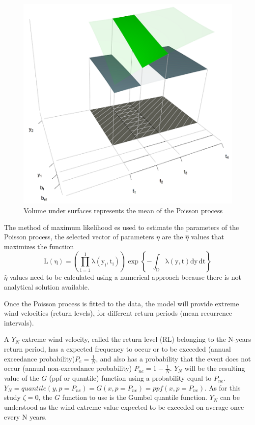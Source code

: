 \documentclass[12pt,oneside]{reedthesis}
\begin{document}
\footnotesize
\begin{figure}
\includegraphics[width=6.35in]{figure/domain3d} \caption{Volume under surfaces represents the mean of the Poisson process}\label{fig:plotdomain3dpp}
\end{figure}
\normalsize

The method of maximum likelihood es used to estimate the parameters of the Poisson process, the selected vector of parameters \(\eta\) are the \(\hat\eta\) values that maximizes the function
\begin{equation}
  \mathrm{
          L(\eta)=\left( 
                        \prod_{i=1}^I\lambda\left(y_i,t_i\right)  
                  \right)
                  \exp\left\{
                            -\int_{{D}}\lambda\left(y,t\right)dy\,dt
                     \right\}
         }
  \label{eq:pplikelihood}
\end{equation}
\(\hat\eta\) values need to be calculated using a numerical approach because there is not analytical solution available.

Once the Poisson process is fitted to the data, the model will provide extreme wind velocities (return levels), for different return periods (mean recurrence intervals).

A \(Y_N\) extreme wind velocity, called the return level (RL) belonging to the N-years return period, has a expected frequency to occur or to be exceeded (annual exceedance probability)\(P_e = \frac{1}{N}\), and also has a probability that the event does not occur (annual non-exceedance probability) \(P_{ne}=1-\frac{1}{N}\). \(Y_N\) will be the resulting value of the \(G\) (ppf or quantile) function using a probability equal to \(P_{ne}\). \(Y_N=quantile(y, p=P_{ne})=G(x,p=P_{ne})=ppf(x,p=P_{ne})\). As for this study \(\zeta = 0\), the \(G\) function to use is the Gumbel quantile function. \(Y_N\) can be understood as the wind extreme value expected to be exceeded on average once every N years.
\end{document}
